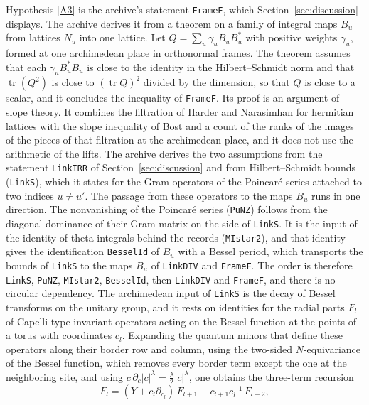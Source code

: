 \documentclass[11pt,letterpaper]{article}
\numberwithin{equation}{section}
\begin{document}
Hypothesis \eqref{A3} is the archive's statement \texttt{FrameF}, which Section~\ref{sec:discussion} displays. The archive derives it from a theorem on a family of integral maps $B_u$ from lattices $N_u$ into one lattice. Let $Q=\sum_u\gamma_uB_uB_u^{*}$ with positive weights $\gamma_u$, formed at one archimedean place in orthonormal frames. The theorem assumes that each $\gamma_uB_u^{*}B_u$ is close to the identity in the Hilbert--Schmidt norm and that $\operatorname{tr}(Q^2)$ is close to $(\operatorname{tr}Q)^2$ divided by the dimension, so that $Q$ is close to a scalar, and it concludes the inequality of \texttt{FrameF}. Its proof is an argument of slope theory. It combines the filtration of Harder and Narasimhan for hermitian lattices \cite{stuhler,grayson} with the slope inequality of Bost \cite{bost} and a count of the ranks of the images of the pieces of that filtration at the archimedean place, and it does not use the arithmetic of the lifts. The archive derives the two assumptions from the statement \texttt{LinkIRR} of Section~\ref{sec:discussion} and from Hilbert--Schmidt bounds (\texttt{LinkS}), which it states for the Gram operators of the Poincar\'e series attached to two indices $u\ne u'$. The passage from these operators to the maps $B_u$ runs in one direction. The nonvanishing of the Poincar\'e series (\texttt{PuNZ}) follows from the diagonal dominance of their Gram matrix on the side of \texttt{LinkS}. It is the input of the identity of theta integrals behind the records (\texttt{MIstar2}), and that identity gives the identification \texttt{BesselId} of $B_u$ with a Bessel period, which transports the bounds of \texttt{LinkS} to the maps $B_u$ of \texttt{LinkDIV} and \texttt{FrameF}. The order is therefore \texttt{LinkS}, \texttt{PuNZ}, \texttt{MIstar2}, \texttt{BesselId}, then \texttt{LinkDIV} and \texttt{FrameF}, and there is no circular dependency. The archimedean input of \texttt{LinkS} is the decay of Bessel transforms on the unitary group, and it rests on identities for the radial parts $F_l$ of Capelli-type invariant operators acting on the Bessel function at the points of a torus with coordinates $c_l$. Expanding the quantum minors that define these operators along their border row and column, using the two-sided $N$-equivariance of the Bessel function, which removes every border term except the one at the neighboring site, and using $c\,\partial_c\lvert c\rvert^{\lambda}=\tfrac\lambda2\lvert c\rvert^{\lambda}$, one obtains the three-term recursion
\[
F_l=(Y+c_l\partial_{c_l})\,F_{l+1}-c_{l+1}c_l^{-1}\,F_{l+2},
\]
\end{document}
